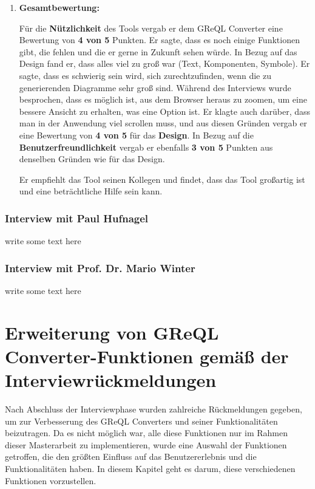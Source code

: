 \begin{enumerate}[itemsep=8pt, parsep=5pt]
    \item \textbf{Gesamtbewertung:}


    Für die \textbf{Nützlichkeit} des Tools vergab er dem GReQL Converter eine Bewertung von \textbf{4 von 5} Punkten.
    Er sagte, dass es noch einige Funktionen gibt, die fehlen und die er gerne in Zukunft sehen würde. In Bezug auf das
    Design fand er, dass alles viel zu groß war (Text, Komponenten, Symbole). Er sagte, dass es schwierig sein wird,
    sich zurechtzufinden, wenn die zu generierenden Diagramme sehr groß sind. Während des Interviews wurde besprochen,
    dass es möglich ist, aus dem Browser heraus zu zoomen, um eine bessere Ansicht zu erhalten, was eine Option ist.
    Er klagte auch darüber, dass man in der Anwendung viel scrollen muss, und aus diesen Gründen vergab er eine
    Bewertung von \textbf{4 von 5} für das \textbf{Design}. In Bezug auf die \textbf{Benutzerfreundlichkeit} vergab er
    ebenfalls \textbf{3 von 5} Punkten aus denselben Gründen wie für das Design.

    Er empfiehlt das Tool seinen Kollegen und findet, dass das Tool großartig ist und eine beträchtliche Hilfe sein
    kann.
\end{enumerate}

\subsubsection{Interview mit Paul Hufnagel}
write some text here

\subsubsection{Interview mit Prof. Dr. Mario Winter}
write some text here

\section{Erweiterung von GReQL Converter-Funktionen gemäß der Interviewrückmeldungen}

Nach Abschluss der Interviewphase wurden zahlreiche Rückmeldungen gegeben, um zur Verbesserung des GReQL Converters und
seiner Funktionalitäten beizutragen. Da es nicht möglich war, alle diese Funktionen nur im Rahmen dieser Masterarbeit
zu implementieren, wurde eine Auswahl der Funktionen getroffen, die den größten Einfluss auf das Benutzererlebnis und
die Funktionalitäten haben. In diesem Kapitel geht es darum, diese verschiedenen Funktionen vorzustellen.

